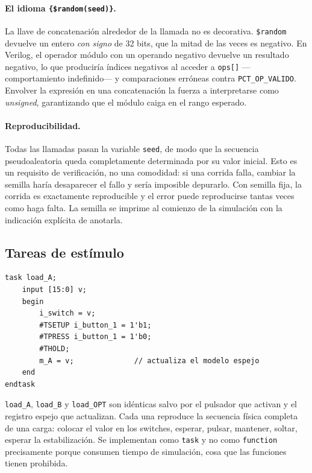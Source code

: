 \documentclass[12pt,a4paper]{article}
\begin{document}
\paragraph{El idioma \texttt{\{\$random(seed)\}}.}
La llave de concatenación alrededor de la llamada no es decorativa.
\texttt{\$random} devuelve un entero \emph{con signo} de 32 bits, que la mitad
de las veces es negativo. En Verilog, el operador módulo con un operando
negativo devuelve un resultado negativo, lo que produciría índices negativos al
acceder a \texttt{ops[]} —comportamiento indefinido— y comparaciones erróneas
contra \texttt{PCT\_OP\_VALIDO}. Envolver la expresión en una concatenación la
fuerza a interpretarse como \emph{unsigned}, garantizando que el módulo caiga en
el rango esperado.

\paragraph{Reproducibilidad.} Todas las llamadas pasan la variable
\texttt{seed}, de modo que la secuencia pseudoaleatoria queda completamente
determinada por su valor inicial. Esto es un requisito de verificación, no una
comodidad: si una corrida falla, cambiar la semilla haría desaparecer el fallo y
sería imposible depurarlo. Con semilla fija, la corrida es exactamente
reproducible y el error puede reproducirse tantas veces como haga falta. La
semilla se imprime al comienzo de la simulación con la indicación explícita de
anotarla.

\subsection{Tareas de estímulo}

\begin{lstlisting}[caption={Tareas de carga de registros.},label={lst:load}]
task load_A;
    input [15:0] v;
    begin
        i_switch = v;
        #TSETUP i_button_1 = 1'b1;
        #TPRESS i_button_1 = 1'b0;
        #THOLD;
        m_A = v;              // actualiza el modelo espejo
    end
endtask
\end{lstlisting}

\texttt{load\_A}, \texttt{load\_B} y \texttt{load\_OPT} son idénticas salvo por
el pulsador que activan y el registro espejo que actualizan. Cada una reproduce
la secuencia física completa de una carga: colocar el valor en los switches,
esperar, pulsar, mantener, soltar, esperar la estabilización. Se implementan
como \texttt{task} y no como \texttt{function} precisamente porque consumen
tiempo de simulación, cosa que las funciones tienen prohibida.
\end{document}
